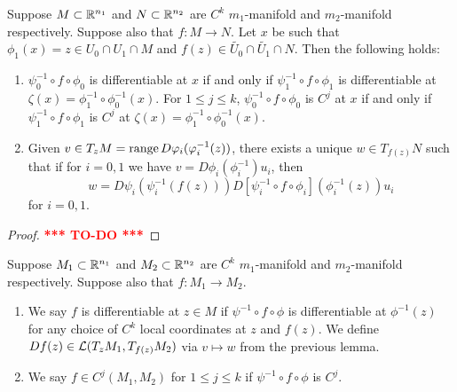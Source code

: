 \documentclass[a4paper]{article}
\newcommand{\TODO}{\textcolor{red}{\textbf{*** TO-DO ***}}}
\begin{document}
\begin{lemma}
  Suppose $M \subset \mathbb{R}^{n_1}$ and $N \subset \mathbb{R}^{n_2}$ are $C^k$
  $m_1$-manifold and $m_2$-manifold respectively. Suppose also that $f : M
    \to N$. Let $x$ be such that $\phi_1(x) = z \in U_0 \cap U_1 \cap M$ and
  $f(z) \in \tilde{U_0} \cap \tilde{U_1} \cap N$. Then the following
  holds:
  \begin{enumerate}
    \item $\psi_0^{-1} \circ f \circ \phi_0$ is differentiable
          at $x$ if and only if $\psi_1^{-1} \circ f \circ \phi_1$
          is differentiable at $\zeta(x) = \phi_1^{-1} \circ
            \phi_0^{-1} (x)$. For $1 \leq j \leq k$,
          $\psi_0^{-1} \circ f \circ \phi_0$ is $C^j$
          at $x$ if and only if $\psi_1^{-1} \circ f \circ \phi_1$
          is $C^j$ at $\zeta(x) = \phi_1^{-1} \circ
            \phi_0^{-1} (x)$.

    \item Given $v \in T_z M = \operatorname{range} D \varphi_i (\varphi_i^{-1}(z))$, there
          exists a unique $w \in T_{f(z)} N$ such that if for $i = 0, 1$
          we have $v = D \phi_i (\phi_i^{-1}) u_i$, then
          \[
            w = D \psi_i (\psi_i^{-1} (f(z)))
            D [\psi_i^{-1} \circ f \circ \phi_i] (\phi_i^{-1}(z)) u_i
          \]
          for $i = 0, 1$.
  \end{enumerate}
\end{lemma}

\begin{proof}
  \TODO
\end{proof}

\begin{defi}
  Suppose $M_1 \subset \mathbb{R}^{n_1}$ and $M_2 \subset \mathbb{R}^{n_2}$ are $C^k$
  $m_1$-manifold and $m_2$-manifold respectively. Suppose also that $f :
    M_1 \to M_2$.

  \begin{enumerate}
    \item We say $f$ is differentiable at $z \in M$ if $\psi^{-1} \circ f
          \circ \phi$ is differentiable at $\phi^{-1}(z)$ for any choice
          of $C^k$ local coordinates at $z$ and $f(z)$. We define $Df(z)
          \in \mathcal{L}(T_z M_1, T_{f(z)} M_2)$ via $v \mapsto w$ from the
          previous lemma.

    \item We say $f \in C^j (M_1, M_2)$ for $1 \leq j \leq k$ if
          $\psi^{-1} \circ f \circ \phi$ is $C^j$.
  \end{enumerate}
\end{defi}
\end{document}
